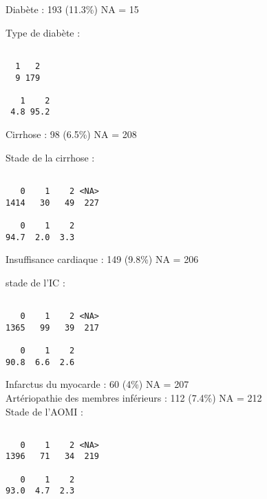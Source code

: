 \documentclass[11pt,a4paper]{article}\usepackage[]{graphicx}\usepackage[]{color}
\makeatletter
\newenvironment{kframe}{%
 \def\at@end@of@kframe{}%
 \ifinner\ifhmode%
  \def\at@end@of@kframe{\end{minipage}}%
  \begin{minipage}{\columnwidth}%
 \fi\fi%
 \def\FrameCommand##1{\hskip\@totalleftmargin \hskip-\fboxsep
 \colorbox{shadecolor}{##1}\hskip-\fboxsep
     \hskip-\linewidth \hskip-\@totalleftmargin \hskip\columnwidth}%
 \MakeFramed {\advance\hsize-\width
   \@totalleftmargin\z@ \linewidth\hsize
   \@setminipage}}%
 {\par\unskip\endMakeFramed%
 \at@end@of@kframe}
\newenvironment{knitrout}{}{} %
\makeatother
\begin{document}
Diabète : 193 (11.3\%) NA = 15

Type de diabète :
\begin{knitrout}
\color{fgcolor}\begin{kframe}
\begin{verbatim}

  1   2 
  9 179 

   1    2 
 4.8 95.2 
\end{verbatim}
\end{kframe}
\end{knitrout}

Cirrhose : 98 (6.5\%) NA = 208

Stade de la cirrhose :

\begin{knitrout}
\color{fgcolor}\begin{kframe}
\begin{verbatim}

   0    1    2 <NA> 
1414   30   49  227 

   0    1    2 
94.7  2.0  3.3 
\end{verbatim}
\end{kframe}
\end{knitrout}

Insuffisance cardiaque : 149 (9.8\%) NA = 206

stade de l’IC :

\begin{knitrout}
\color{fgcolor}\begin{kframe}
\begin{verbatim}

   0    1    2 <NA> 
1365   99   39  217 

   0    1    2 
90.8  6.6  2.6 
\end{verbatim}
\end{kframe}
\end{knitrout}

Infarctus du myocarde : 60 (4\%) NA = 207
~\\

Artériopathie des membres inférieurs : 112 (7.4\%) NA = 212
~\\

Stade de l’AOMI : 

\begin{knitrout}
\color{fgcolor}\begin{kframe}
\begin{verbatim}

   0    1    2 <NA> 
1396   71   34  219 

   0    1    2 
93.0  4.7  2.3 
\end{verbatim}
\end{kframe}
\end{knitrout}
\end{document}
